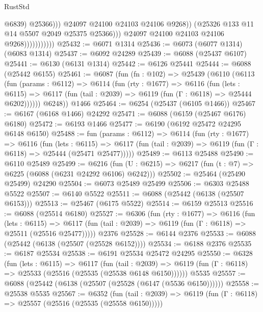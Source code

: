 \begin{lexlean}{RustStd}
\begin{coremodule}
                                          @6839)
                                        @25366)))
                                  @24097
                                  @24100
                                  @24103
                                  @24106
                                  @9268))
                              (@25326 @133 @11 @14 @5507 @2049 @25375 @25366)))
                          @24097
                          @24100
                          @24103
                          @24106
                          @9268)))))))))))
@25432 := @6071 @1314
@25436 := @6073 (@6077 @1314) (@6083 @1314)
@25437 := @6092 @24289
@25439 := @6088 (@25437 @6107)
@25441 := @6130 (@6131 @1314)
@25442 := @6126 @25441
@25444 := @6088 (@25442 @6155)
@25461 := @6087
    (fun (fn : @102) =>
    @25439
      (@6110
        (@6113
          (fun (params : @6112) =>
          @6114
            (fun (rty : @1677) =>
            @6116
              (fun (lets : @6115) =>
              @6117 (fun (tail : @2039) => @6119 (fun (Γ : @6118) => @25444 @6202))))))
        @6248))
    @1466
@25464 := @6254 (@25437 (@6105 @1466))
@25467 := @6167 (@6168 @1466) @24292
@25471 := @6088 (@6159 (@25467 @6176) @6180)
@25472 := @6193 @1466
@25477 := @6190 (@6192 @25472 @24295 @6148 @6150)
@25488 := fun (params : @6112) =>
  @6114
    (fun (rty : @1677) =>
    @6116
      (fun (lets : @6115) =>
      @6117 (fun (tail : @2039) => @6119 (fun (Γ : @6118) => @25444 (@25471 @25477)))))
@25489 := @6113 @25488
@25490 := @6110 @25489
@25499 := @6216
    (fun (U : @6215) => @6217 (fun (t : @7) => @6225 (@6088 (@6231 @24292 @6106) @6242)))
@25502 := @25464 (@25490 @25499) @24290
@25504 := @6073 @25489 @25499
@25506 := @6303 @25488 @5522
@25507 := @6140 @5522
@25511 := @6088 (@25442 (@6138 (@25507 @6153)))
@25513 := @25467 (@6175 @5522)
@25514 := @6159 @25513
@25516 := @6088 (@25514 @6180)
@25527 := @6306
    (fun (rty : @1677) =>
    @6116
      (fun (lets : @6115) =>
      @6117 (fun (tail : @2039) => @6119 (fun (Γ : @6118) => @25511 (@25516 @25477)))))
    @2376
@25528 := @6144 @2376
@25533 := @6088 (@25442 (@6138 (@25507 (@25528 @6152))))
@25534 := @6188 @2376
@25535 := @6187 @25534
@25538 := @6191 @25534 @25472 @24295
@25550 := @6328
    (fun (lets : @6115) =>
    @6117
      (fun (tail : @2039) =>
      @6119 (fun (Γ : @6118) => @25533 (@25516 (@25535 (@25538 @6148 @6150))))))
    @5535
@25557 := @6088 (@25442 (@6138 (@25507 (@25528 (@6147 (@5536 @6150))))))
@25558 := @25538 @5535
@25567 := @6352
    (fun (tail : @2039) => @6119 (fun (Γ : @6118) => @25557 (@25516 (@25535 (@25558 @6150)))))

\end{coremodule}
\end{lexlean}

